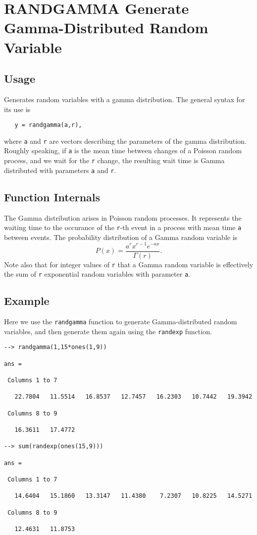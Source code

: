 \section{RANDGAMMA Generate Gamma-Distributed Random Variable}

\subsection{Usage}

Generates random variables with a gamma distribution.  The general
syntax for its use is
\begin{verbatim}
   y = randgamma(a,r),
\end{verbatim}
where \verb|a| and \verb|r| are vectors describing the parameters of the
gamma distribution.  Roughly speaking, if \verb|a| is the mean time between
changes of a Poisson random process, and we wait for the \verb|r| change,
the resulting wait time is Gamma distributed with parameters \verb|a| 
and \verb|r|.
\subsection{Function Internals}

The Gamma distribution arises in Poisson random processes.  It represents
the waiting time to the occurance of the \verb|r|-th event in a process with
mean time \verb|a| between events.  The probability distribution of a Gamma
random variable is
\[
   P(x) = \frac{a^r x^{r-1} e^{-ax}}{\Gamma(r)}.
\]
Note also that for integer values of \verb|r| that a Gamma random variable
is effectively the sum of \verb|r| exponential random variables with parameter
\verb|a|.
\subsection{Example}

Here we use the \verb|randgamma| function to generate Gamma-distributed
random variables, and then generate them again using the \verb|randexp|
function.
\begin{verbatim}
--> randgamma(1,15*ones(1,9))

ans = 

 Columns 1 to 7

   22.7804   11.5514   16.8537   12.7457   16.2303   10.7442   19.3942 

 Columns 8 to 9

   16.3611   17.4772 

--> sum(randexp(ones(15,9)))

ans = 

 Columns 1 to 7

   14.6404   15.1860   13.3147   11.4380    7.2307   10.8225   14.5271 

 Columns 8 to 9

   12.4631   11.8753 
\end{verbatim}
